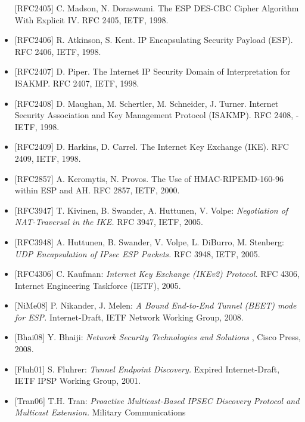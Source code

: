 \documentclass[a4paper]{article}
\begin{document}
\begin{multicols}{3}
\begin{itemize}
              {[}RFC2405{]} C. Madson, N. Doraswami. The ESP DES-CBC Cipher
              Algorithm With Explicit IV. RFC 2405, IETF, 1998.
        \item
              {[}RFC2406{]} R. Atkinson, S. Kent. IP Encapsulating Security Payload
              (ESP). RFC 2406, IETF, 1998.
        \item
              {[}RFC2407{]} D. Piper. The Internet IP Security Domain of
              Interpretation for ISAKMP. RFC 2407, IETF, 1998.
        \item
              {[}RFC2408{]} D. Maughan, M. Schertler, M. Schneider, J. Turner.
              Internet Security Association and Key Management Protocol (ISAKMP).
              RFC 2408, - IETF, 1998.
        \item
              {[}RFC2409{]} D. Harkins, D. Carrel. The Internet Key Exchange (IKE).
              RFC 2409, IETF, 1998.
        \item
              {[}RFC2857{]} A. Keromytis, N. Provos. The Use of HMAC-RIPEMD-160-96
              within ESP and AH. RFC 2857, IETF, 2000.
        \item
              {[}RFC3947{]} T. Kivinen, B. Swander, A. Huttunen, V. Volpe:
              \emph{Negotiation of NAT-Traversal in the IKE.} RFC 3947, IETF, 2005.
        \item
              {[}RFC3948{]} A. Huttunen, B. Swander, V. Volpe, L. DiBurro, M.
              Stenberg: \emph{UDP Encapsulation of IPsec ESP Packets.} RFC 3948,
              IETF, 2005.
        \item
              {[}RFC4306{]} C. Kaufman: \emph{Internet Key Exchange (IKEv2)
                  Protocol.} RFC 4306, Internet Engineering Taskforce (IETF), 2005.
        \item
              {[}NiMe08{]} P. Nikander, J. Melen: \emph{A Bound End-to-End Tunnel
                  (BEET) mode for ESP.} Internet-Draft, IETF Network Working Group,
              2008.
        \item
              {[}Bhai08{]} Y. Bhaiji: \emph{Network Security Technologies and
                  Solutions} , Cisco Press, 2008.
        \item
              {[}Fluh01{]} S. Fluhrer: \emph{Tunnel Endpoint Discovery.} Expired
              Internet-Draft, IETF IPSP Working Group, 2001.
        \item
              {[}Tran06{]} T.H. Tran: \emph{Proactive Multicast-Based IPSEC
                  Discovery Protocol and Multicast Extension.} Military Communications

\end{itemize}
\end{multicols}
\end{document}
